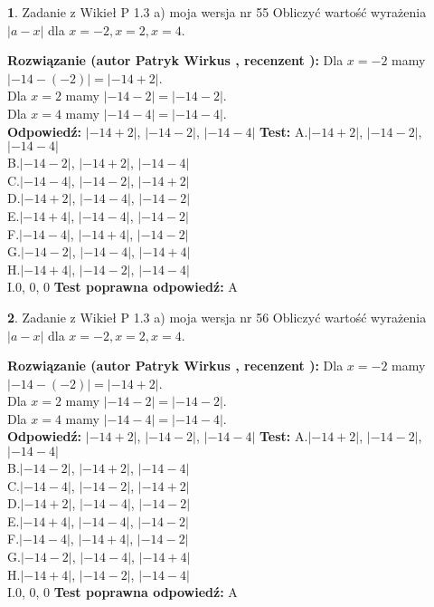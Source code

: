\documentclass[12pt, a4paper]{article}
\theoremstyle{definition} %
\newtheorem{zad}{}
\newcommand{\zadStart}[1]{\begin{zad}#1\newline}
\newcommand{\zadStop}{\end{zad}}
\newcommand{\rozwStart}[2]{\noindent \textbf{Rozwiązanie (autor #1 , recenzent #2): }\newline}
\newcommand{\rozwStop}{\newline}
\newcommand{\odpStart}{\noindent \textbf{Odpowiedź:}\newline}
\newcommand{\odpStop}{\newline}
\newcommand{\testStart}{\noindent \textbf{Test:}\newline}
\newcommand{\testStop}{\newline}
\newcommand{\kluczStart}{\noindent \textbf{Test poprawna odpowiedź:}\newline}
\newcommand{\kluczStop}{\newline}
\begin{document}
\zadStart{Zadanie z Wikieł P 1.3 a) moja wersja nr 55}
Obliczyć wartość wyrażenia $|a - x|$ dla $x=-2,x=2,x=4$.
\zadStop
\rozwStart{Patryk Wirkus}{}
Dla $x = -2$ mamy $|-14 - (-2)| = |-14 + 2|$.\\
Dla $x = 2$ mamy $|-14 - 2| = |-14 - 2|$.\\
Dla $x = 4$ mamy $|-14 - 4| = |-14 - 4|$.\\
\rozwStop
\odpStart
$|-14 + 2|$, $|-14 - 2|$, $|-14 - 4|$
\odpStop
\testStart
A.$|-14 + 2|$, $|-14 - 2|$, $|-14 - 4|$\\
B.$|-14 - 2|$, $|-14 + 2|$, $|-14 - 4|$\\
C.$|-14 - 4|$, $|-14 - 2|$, $|-14 + 2|$\\
D.$|-14 + 2|$, $|-14 - 4|$, $|-14 - 2|$\\
E.$|-14 + 4|$, $|-14 - 4|$, $|-14 - 2|$\\
F.$|-14 - 4|$, $|-14 + 4|$, $|-14 - 2|$\\
G.$|-14 - 2|$, $|-14 - 4|$, $|-14 + 4|$\\
H.$|-14 + 4|$, $|-14 - 2|$, $|-14 - 4|$\\
I.$0$, $0$, $0$
\testStop
\kluczStart
A
\kluczStop



\zadStart{Zadanie z Wikieł P 1.3 a) moja wersja nr 56}
Obliczyć wartość wyrażenia $|a - x|$ dla $x=-2,x=2,x=4$.
\zadStop
\rozwStart{Patryk Wirkus}{}
Dla $x = -2$ mamy $|-14 - (-2)| = |-14 + 2|$.\\
Dla $x = 2$ mamy $|-14 - 2| = |-14 - 2|$.\\
Dla $x = 4$ mamy $|-14 - 4| = |-14 - 4|$.\\
\rozwStop
\odpStart
$|-14 + 2|$, $|-14 - 2|$, $|-14 - 4|$
\odpStop
\testStart
A.$|-14 + 2|$, $|-14 - 2|$, $|-14 - 4|$\\
B.$|-14 - 2|$, $|-14 + 2|$, $|-14 - 4|$\\
C.$|-14 - 4|$, $|-14 - 2|$, $|-14 + 2|$\\
D.$|-14 + 2|$, $|-14 - 4|$, $|-14 - 2|$\\
E.$|-14 + 4|$, $|-14 - 4|$, $|-14 - 2|$\\
F.$|-14 - 4|$, $|-14 + 4|$, $|-14 - 2|$\\
G.$|-14 - 2|$, $|-14 - 4|$, $|-14 + 4|$\\
H.$|-14 + 4|$, $|-14 - 2|$, $|-14 - 4|$\\
I.$0$, $0$, $0$
\testStop
\kluczStart
A
\kluczStop
\end{document}
